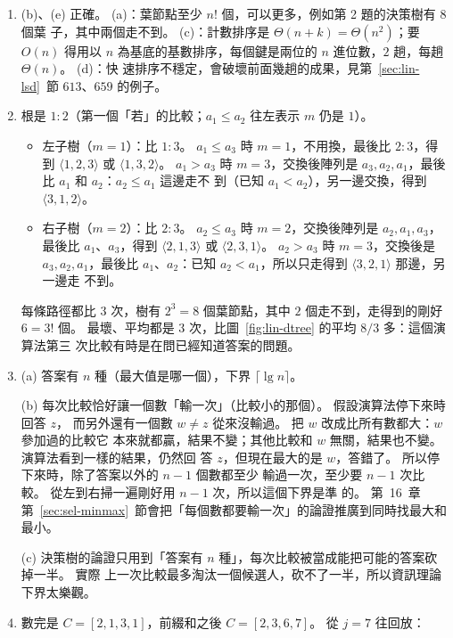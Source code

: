 \begin{enumerate}
\item (b)、(e) 正確。 (a)：葉節點至少 $n!$ 個，可以更多，例如第 2 題的決策樹有 $8$ 個葉
子，其中兩個走不到。 (c)：計數排序是 $\Theta(n + k) = \Theta(n^2)$；要 $O(n)$ 得用以
$n$ 為基底的基數排序，每個鍵是兩位的 $n$ 進位數，$2$ 趟，每趟 $\Theta(n)$。 (d)：快
速排序不穩定，會破壞前面幾趟的成果，見第~\ref{sec:lin-lsd}~節 $613$、$659$ 的例子。

\item 根是 $1{:}2$（第一個「若」的比較；$a_1 \le a_2$ 往左表示 $m$ 仍是 $1$）。
\begin{itemize}
\item 左子樹（$m = 1$）：比 $1{:}3$。 $a_1 \le a_3$ 時 $m = 1$，不用換，最後比
$2{:}3$，得到 $\langle 1, 2, 3 \rangle$ 或 $\langle 1, 3, 2 \rangle$。 $a_1 > a_3$ 時
$m = 3$，交換後陣列是 $a_3, a_2, a_1$，最後比 $a_1$ 和 $a_2$：$a_2 \le a_1$ 這邊走不
到（已知 $a_1 < a_2$），另一邊交換，得到 $\langle 3, 1, 2 \rangle$。
\item 右子樹（$m = 2$）：比 $2{:}3$。 $a_2 \le a_3$ 時 $m = 2$，交換後陣列是
$a_2, a_1, a_3$，最後比 $a_1$、$a_3$，得到 $\langle 2, 1, 3 \rangle$ 或
$\langle 2, 3, 1 \rangle$。 $a_2 > a_3$ 時 $m = 3$，交換後是 $a_3, a_2, a_1$，最後比
$a_1$、$a_2$：已知 $a_2 < a_1$，所以只走得到 $\langle 3, 2, 1 \rangle$ 那邊，另一邊走
不到。
\end{itemize}
每條路徑都比 $3$ 次，樹有 $2^3 = 8$ 個葉節點，其中 $2$ 個走不到，走得到的剛好 $6 = 3!$
個。 最壞、平均都是 $3$ 次，比圖~\ref{fig:lin-dtree} 的平均 $8/3$ 多：這個演算法第三
次比較有時是在問已經知道答案的問題。

\item (a) 答案有 $n$ 種（最大值是哪一個），下界 $\lceil \lg n \rceil$。

(b) 每次比較恰好讓一個數「輸一次」（比較小的那個）。 假設演算法停下來時回答 $z$，
而另外還有一個數 $w \ne z$ 從來沒輸過。 把 $w$ 改成比所有數都大：$w$ 參加過的比較它
本來就都贏，結果不變；其他比較和 $w$ 無關，結果也不變。 演算法看到一樣的結果，仍然回
答 $z$，但現在最大的是 $w$，答錯了。 所以停下來時，除了答案以外的 $n - 1$ 個數都至少
輸過一次，至少要 $n - 1$ 次比較。 從左到右掃一遍剛好用 $n - 1$ 次，所以這個下界是準
的。 第~16~章第~\ref{sec:sel-minmax}~節會把「每個數都要輸一次」的論證推廣到同時找最大和
最小。

(c) 決策樹的論證只用到「答案有 $n$ 種」，每次比較被當成能把可能的答案砍掉一半。 實際
上一次比較最多淘汰一個候選人，砍不了一半，所以資訊理論下界太樂觀。

\item 數完是 $C = [2, 1, 3, 1]$，前綴和之後 $C = [2, 3, 6, 7]$。 從 $j = 7$ 往回放：


\end{enumerate}
